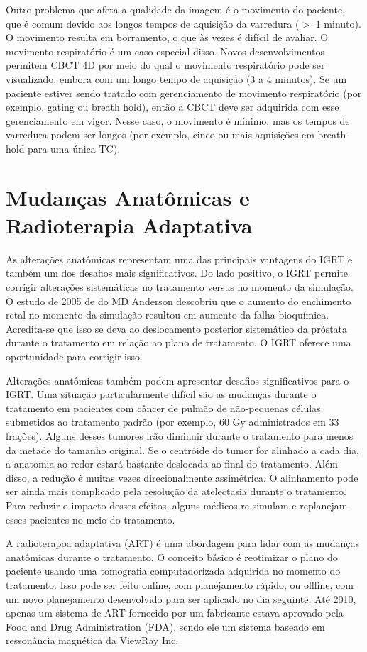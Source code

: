 \documentclass[11pt,a4paper]{article}
\newcounter{exemplo}
\begin{document}
	Outro problema que afeta a qualidade da imagem é o movimento do paciente, que é comum devido aos longos tempos de aquisição da varredura ($>$ 1 minuto). O movimento resulta em borramento, o que às vezes é difícil de avaliar. O movimento respiratório é um caso especial disso. Novos desenvolvimentos permitem CBCT 4D por meio do qual o movimento respiratório pode ser visualizado, embora com um longo tempo de aquisição (3 a 4 minutos). Se um paciente estiver sendo tratado com gerenciamento de movimento respiratório (por exemplo, gating ou breath hold), então a CBCT deve ser adquirida com esse gerenciamento em vigor. Nesse caso, o movimento é mínimo, mas os tempos de varredura podem ser longos (por exemplo, cinco ou mais aquisições em breath-hold para uma única TC).

\section{Mudanças Anatômicas e Radioterapia Adaptativa}

	As alterações anatômicas representam uma das principais vantagens do IGRT e também um dos desafios mais significativos. Do lado positivo, o IGRT permite corrigir alterações sistemáticas no tratamento versus no momento da simulação. O estudo de 2005 de \citet{de2005increased}  do MD Anderson descobriu que o aumento do enchimento retal no momento da simulação resultou em aumento da falha bioquímica. Acredita-se que isso se deva ao deslocamento posterior sistemático da próstata durante o tratamento em relação ao plano de tratamento. O IGRT oferece uma oportunidade para corrigir isso.

	Alterações anatômicas também podem apresentar desafios significativos para o IGRT. Uma situação particularmente difícil são as mudanças durante o tratamento em pacientes com câncer de pulmão de não-pequenas células submetidos ao tratamento padrão (por exemplo, 60 Gy administrados em 33 frações). Alguns desses tumores irão diminuir durante o tratamento para menos da metade do tamanho original. Se o centróide do tumor for alinhado a cada dia, a anatomia ao redor estará bastante deslocada ao final do tratamento. Além disso, a redução é muitas vezes direcionalmente assimétrica. O alinhamento pode ser ainda mais complicado pela resolução da atelectasia durante o tratamento. Para reduzir o impacto desses efeitos, alguns médicos re-simulam e replanejam esses pacientes no meio do tratamento.

	A radioterapoa adaptativa (ART) é uma abordagem para lidar com as mudanças anatômicas durante o tratamento. O conceito básico é reotimizar o plano do paciente usando uma tomografia computadorizada adquirida no momento do tratamento. Isso pode ser feito online, com planejamento rápido, ou offline, com um novo planejamento desenvolvido para ser aplicado no dia seguinte. Até 2010, apenas um sistema de ART fornecido por um fabricante estava aprovado pela Food and Drug Administration (FDA), sendo ele um sistema baseado em ressonância magnética da ViewRay Inc. 
\end{document}
